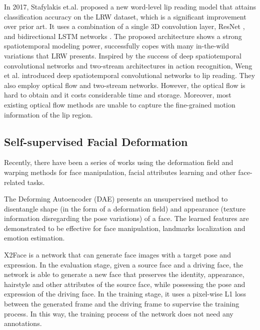 \documentclass[a4paper, 10pt, conference]{ieeeconf}      \usepackage{FG2020}
\begin{document}
 In 2017, Stafylakis et.al. \cite{Stafylakis2017CombiningRN} proposed a new word-level lip reading model that attains  classification accuracy on the
 LRW dataset, which is a significant improvement over prior art. It uses a
 combination of a single 3D convolution layer, ResNet
 \cite{he2016deep}, and bidirectional LSTM networks \cite{hochreiter1997long}. The proposed architecture shows a strong spatiotemporal modeling power, successfully copes with many in-the-wild variations that LRW presents.
Inspired by the success of deep spatiotemporal convolutional networks and two-stream architectures in action recognition, Weng et al. \cite{weng2019importance} introduced deep spatiotemporal convolutional networks to lip reading. They also employ optical flow and two-stream networks. However, the optical flow is hard to obtain and it costs considerable time and storage. Moreover, most existing optical flow methods are unable to capture the fine-grained motion information of the lip region.
 


 


 
 \subsection{Self-supervised Facial Deformation}
 
 Recently, there have been a series of works using the deformation field and warping methods for face manipulation, facial attributes learning and other face-related tasks.
 
 The Deforming Autoencoder (DAE) \cite{shu2018deforming} presents an unsupervised method to disentangle shape (in the form of a deformation field) and appearance (texture information disregarding the pose variations) of a face. The learned features are demonstrated to be effective for face manipulation, landmarks localization and emotion estimation.
 
 X2Face \cite{Wiles2018X2FaceAN} is a network that can generate face images with a target pose and expression.
 In the evaluation stage, given a source face and a driving face, the network is able to generate a new face that preserves the identity, appearance, hairstyle and other attributes of the source face, while possessing the pose and expression of the driving face. 
 In the training stage, it uses a pixel-wise L1 loss between the generated frame and the driving frame to supervise the training process. In this way, the training process of the network does not need any annotations.
\end{document}
